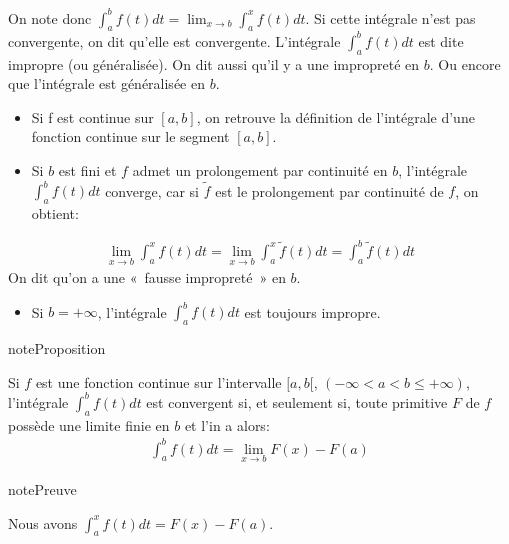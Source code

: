 \documentclass[letterpaper,10pt,french]{sphinxmanual}
\begin{document}
\sphinxAtStartPar
On note donc \(\int_a^b f(t)dt = \lim_{x\to b} \int_a^x f(t)dt\). Si cette intégrale n’est pas convergente, on dit qu’elle est convergente. L’intégrale \(\int_a^b f(t)dt\) est dite impropre (ou généralisée). On dit aussi qu’il y a une impropreté en \(b\). Ou encore que l’intégrale est généralisée en \(b\).

\sphinxAtStartPar
{}
\begin{itemize}
\item {} 
\sphinxAtStartPar
Si f est continue sur \([a, b]\), on retrouve la définition de l’intégrale d’une fonction continue sur le segment \([a, b]\).

\item {} 
\sphinxAtStartPar
Si \(b\) est fini et \(f\) admet un prolongement par continuité en \(b\), l’intégrale \(\int_a^b f(t)dt\) converge, car si \(\tilde{f}\) est le prolongement par continuité de \(f\), on obtient:

\end{itemize}
\begin{equation*}
\begin{split}
\lim_{x \to b} \int_a^x f(t)dt = \lim_{x\to b} \int_a^x \tilde{f}(t)dt = \int_a^b \tilde{f}(t)dt
\end{split}
\end{equation*}
\sphinxAtStartPar
On dit qu’on a une « fausse impropreté » en \(b\).
\begin{itemize}
\item {} 
\sphinxAtStartPar
Si \(b=+\infty\), l’intégrale \(\int_a^b f(t)dt\) est toujours impropre.

\end{itemize}

\begin{sphinxadmonition}{note}{Proposition}

\sphinxAtStartPar
Si \(f\) est une fonction continue sur l’intervalle \([a, b[\), \((-\infty <a < b \leq +\infty)\), l’intégrale \(\int_a^b f(t)dt\) est convergent si, et seulement si, toute primitive \(F\) de \(f\) possède une limite finie en \(b\) et l’in a alors:
\begin{equation*}
\begin{split}
\int_a^b f(t)dt = \lim_{x\to b} F(x) - F(a)
\end{split}
\end{equation*}\end{sphinxadmonition}

\begin{sphinxadmonition}{note}{Preuve}

\sphinxAtStartPar
Nous avons \(\int_a^x f(t)dt=F(x)-F(a)\).
\end{sphinxadmonition}
\end{document}

